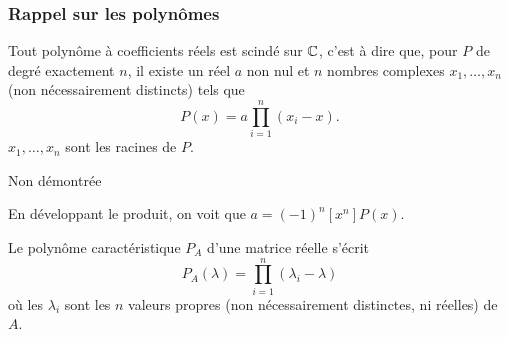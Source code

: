 \eproof

\subsubsection{Rappel sur les polynômes} 

\begin{proposition}
  Tout polynôme à coefficients réels est scindé sur $\mathbb{C}$, c'est à dire que, pour $P$ de degré exactement $n$, il existe un réel $a$ non nul et $n$ nombres complexes $x_1, \dots, x_n$ (non nécessairement distincts) tels que
  $$
  P(x) = a \prod_{i=1}^n (x_i - x).
  $$
  $x_1, \dots, x_n$ sont les racines de $P$.
\end{proposition}

\proof
Non démontrée
\eproof

\remark
En développant le produit, on voit que $a = (-1)^n [x^n] P(x)$.

\begin{corollary} \label{cor:factorisationPolynomeCaracteristique}
  Le polynôme caractéristique $P_A$ d'une matrice réelle s'écrit
  $$
  P_A(\lambda) = \prod_{i=1}^n (\lambda_i - \lambda)
  $$
  où les $\lambda_i$ sont les $n$ valeurs propres (non nécessairement distinctes, ni réelles) de $A$.
\end{corollary}

